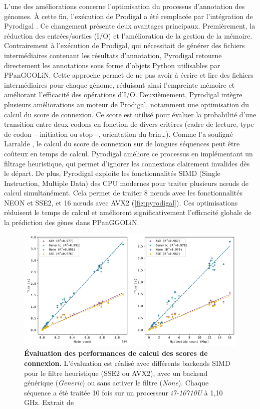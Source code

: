 L’une des améliorations concerne l’optimisation du processus d’annotation des génomes. À cette fin, l’exécution de Prodigal \cite{hyatt_prodigal_2010} a été remplacée par l’intégration de Pyrodigal \cite{larralde_pyrodigal_2022}. Ce changement présente deux avantages principaux. 
Premièrement, la réduction des entrées/sorties (I/O) et l'amélioration de la gestion de la mémoire. Contrairement à l'exécution de Prodigal, qui nécessitait de générer des fichiers intermédiaires contenant les résultats d’annotation, Pyrodigal retourne directement les annotations sous forme d’objets Python utilisables par PPanGGOLiN. Cette approche permet de ne pas avoir à écrire et lire des fichiers intermédiaires pour chaque génome, réduisant ainsi l’empreinte mémoire et améliorant l’efficacité des opérations d’I/O. Deuxièmement, Pyrodigal intègre plusieurs améliorations au moteur de Prodigal, notamment une optimisation du calcul du score de connexion. Ce score est utilisé pour évaluer la probabilité d’une transition entre deux codons en fonction de divers critères (cadre de lecture, type de codon – initiation ou stop –, orientation du brin\dots). Comme l’a souligné Larralde \cite{larralde_pyrodigal_2022}, le calcul du score de connexion sur de longues séquences peut être coûteux en temps de calcul. Pyrodigal améliore ce processus en implémentant un filtrage heuristique, qui permet d’ignorer les connexions clairement invalides dès le départ. De plus, Pyrodigal exploite les fonctionnalités SIMD (Single Instruction, Multiple Data) des CPU modernes pour traiter plusieurs n\oe uds de calcul simultanément. Cela permet de traiter 8 n\oe uds avec les fonctionnalités NEON et SSE2, et 16 n\oe uds avec AVX2 (\autoref{fig:pyrodigal}). Ces optimisations réduisent le temps de calcul et améliorent significativement l’efficacité globale de la prédiction des gènes dans PPanGGOLiN.

\begin{figure}[htbp]
    \centering
    \includegraphics[width=0.8\linewidth]{images/pyrodigal.png}
    \caption[Évaluation des performances de calcul des scores de connexions]{\textbf{Évaluation des performances de calcul des scores de connexion.} L'évaluation est réalisé avec différents backends SIMD pour le filtre heuristique (SSE2 ou AVX2), avec un backend générique (\textit{Generic}) ou sans activer le filtre (\textit{None}). Chaque séquence a été traitée 10 fois sur un processeur \textit{i7-10710U} à 1,10 GHz. Extrait de \cite{larralde_pyrodigal_2022}}
    \label{fig:pyrodigal}
\end{figure}

